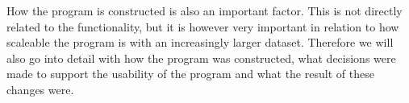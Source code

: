 How the program is constructed is also an important factor. This is not directly related to the functionality, but it is however very important in relation to how scaleable the program is with an increasingly larger dataset. Therefore we will also go into detail with how the program was constructed, what decisions were made to support the usability of the program and what the result of these changes were.


